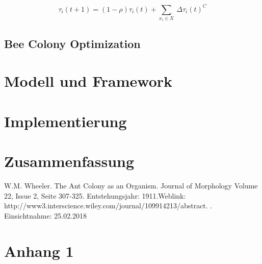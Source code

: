 \documentclass[a4paper, 11pt]{article}
\makeatletter
\newcommand*{\appendixtoc}{%
	\begingroup
	\edef\@alltocdepth{\the\value{tocdepth}}%
	\setcounter{tocdepth}{-10000}%
	\renewcommand*{\contentsname}{%
		Verzeichnis der Anh\"ange}%
	\renewcommand*{\appendixattoc}{%
		\setcounter{tocdepth}{\@alltocdepth}%
	}%
	\tableofcontents%
	\setcounter{tocdepth}{\@alltocdepth}%
	\endgroup
}
\newcommand*{\appendixattoc}{%
}
\makeatother
\begin{document}
\begin{equation}
\tau_{i}(t+1) = (1 - \rho) \tau_{i}(t) + \sum_{x_{i} \in X}\ \Delta \tau_{i}(t)^C
\end{equation}




\subsection{Bee Colony Optimization}
\section{Modell und Framework}
\section{Implementierung}
\section{Zusammenfassung}

\newpage
\begin{thebibliography}{sotief}
	W.M. Wheeler. The Ant Colony as an Organism. Journal of Morphology Volume 22, Issue 2, Seite 307-325. Entstehungsjahr: 1911.\newline\newline Weblink:
	http://www3.interscience.wiley.com/journal/109914213/abstract. . Einsichtnahme: 25.02.2018
\end{thebibliography}
\newpage
\appendixtoc
\newpage
\section{Anhang 1} 
\end{document}
